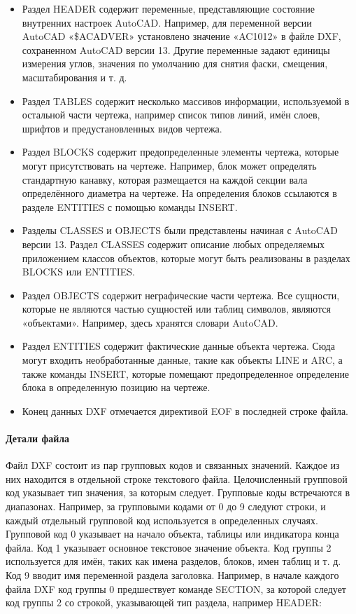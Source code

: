 \begin{itemize}
	\item Раздел HEADER содержит переменные, представляющие состояние внутренних настроек AutoCAD. Например, для переменной версии AutoCAD «\$ACADVER» установлено значение «AC1012» в файле DXF, сохраненном AutoCAD версии 13. Другие переменные задают единицы измерения углов, значения по умолчанию для снятия фаски, смещения, масштабирования и т. д.
	\item Раздел TABLES содержит несколько массивов информации, используемой в остальной части чертежа, например список типов линий, имён слоев, шрифтов и предустановленных видов чертежа.
	\item Раздел BLOCKS содержит предопределенные элементы чертежа, которые могут присутствовать на чертеже. Например, блок может определять стандартную канавку, которая размещается на каждой секции вала определённого диаметра на чертеже. На определения блоков ссылаются в разделе ENTITIES с помощью команды INSERT.
	\item Разделы CLASSES и OBJECTS были представлены начиная с AutoCAD версии 13. Раздел CLASSES содержит описание любых определяемых приложением классов объектов, которые могут быть реализованы в разделах BLOCKS или ENTITIES.
	\item Раздел OBJECTS содержит неграфические части чертежа. Все сущности, которые не являются частью сущностей или таблиц символов, являются «объектами». Например, здесь хранятся словари AutoCAD.
	\item Раздел ENTITIES содержит фактические данные объекта чертежа. Сюда могут входить необработанные данные, такие как объекты LINE и ARC, а также команды INSERT, которые помещают предопределенное определение блока в определенную позицию на чертеже.
	\item Конец данных DXF отмечается директивой EOF в последней строке файла.
\end{itemize}

\paragraph{Детали файла}
Файл DXF состоит из пар групповых кодов и связанных значений. Каждое из них находится в отдельной строке текстового файла. Целочисленный групповой код указывает тип значения, за которым следует. Групповые коды встречаются в диапазонах. Например, за групповыми кодами от 0 до 9 следуют строки, и каждый отдельный групповой код используется в определенных случаях. Групповой код 0 указывает на начало объекта, таблицы или индикатора конца файла. Код 1 указывает основное текстовое значение объекта. Код группы 2 используется для имён, таких как имена разделов, блоков, имен таблиц и т. д. Код 9 вводит имя переменной раздела заголовка. Например, в начале каждого файла DXF код группы 0 предшествует команде SECTION, за которой следует код группы 2 со строкой, указывающей тип раздела, например HEADER:

